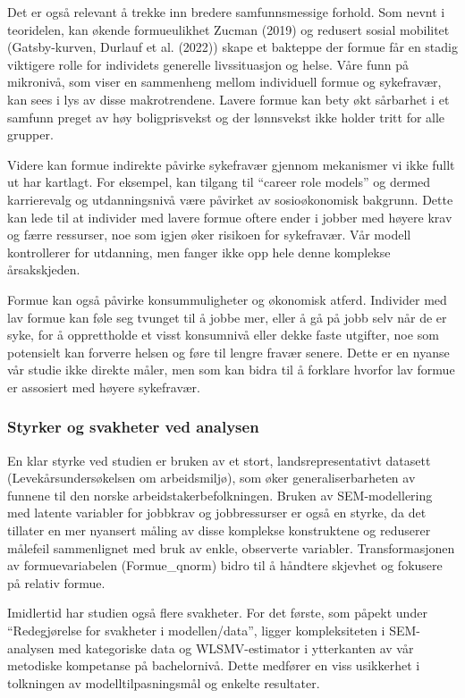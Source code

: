 \documentclass[
  12pt,
  a4paper,
  DIV=11,
  numbers=noendperiod]{scrartcl}
\begin{document}
Det er også relevant å trekke inn bredere samfunnsmessige forhold. Som
nevnt i teoridelen, kan økende formueulikhet Zucman (2019) og redusert
sosial mobilitet (Gatsby-kurven, Durlauf et al. (2022)) skape et
bakteppe der formue får en stadig viktigere rolle for individets
generelle livssituasjon og helse. Våre funn på mikronivå, som viser en
sammenheng mellom individuell formue og sykefravær, kan sees i lys av
disse makrotrendene. Lavere formue kan bety økt sårbarhet i et samfunn
preget av høy boligprisvekst og der lønnsvekst ikke holder tritt for
alle grupper.

Videre kan formue indirekte påvirke sykefravær gjennom mekanismer vi
ikke fullt ut har kartlagt. For eksempel, kan tilgang til ``career role
models'' og dermed karrierevalg og utdanningsnivå være påvirket av
sosioøkonomisk bakgrunn. Dette kan lede til at individer med lavere
formue oftere ender i jobber med høyere krav og færre ressurser, noe som
igjen øker risikoen for sykefravær. Vår modell kontrollerer for
utdanning, men fanger ikke opp hele denne komplekse årsakskjeden.

Formue kan også påvirke konsummuligheter og økonomisk atferd. Individer
med lav formue kan føle seg tvunget til å jobbe mer, eller å gå på jobb
selv når de er syke, for å opprettholde et visst konsumnivå eller dekke
faste utgifter, noe som potensielt kan forverre helsen og føre til
lengre fravær senere. Dette er en nyanse vår studie ikke direkte måler,
men som kan bidra til å forklare hvorfor lav formue er assosiert med
høyere sykefravær.

\subsubsection{Styrker og svakheter ved
analysen}\label{styrker-og-svakheter-ved-analysen}

En klar styrke ved studien er bruken av et stort, landsrepresentativt
datasett (Levekårsundersøkelsen om arbeidsmiljø), som øker
generaliserbarheten av funnene til den norske arbeidstakerbefolkningen.
Bruken av SEM-modellering med latente variabler for jobbkrav og
jobbressurser er også en styrke, da det tillater en mer nyansert måling
av disse komplekse konstruktene og reduserer målefeil sammenlignet med
bruk av enkle, observerte variabler. Transformasjonen av
formuevariabelen (Formue\_qnorm) bidro til å håndtere skjevhet og
fokusere på relativ formue.

Imidlertid har studien også flere svakheter. For det første, som påpekt
under ``Redegjørelse for svakheter i modellen/data'', ligger
kompleksiteten i SEM-analysen med kategoriske data og WLSMV-estimator i
ytterkanten av vår metodiske kompetanse på bachelornivå. Dette medfører
en viss usikkerhet i tolkningen av modelltilpasningsmål og enkelte
resultater.
\end{document}
